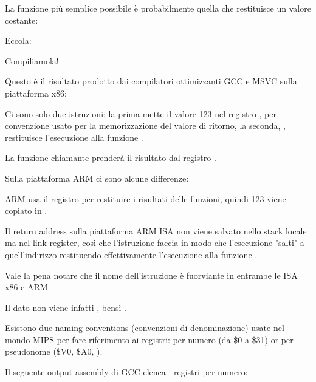 
La funzione più semplice possibile è probabilmente quella che restituisce un valore costante:

Eccola:



Compiliamola!


Questo è il risultato prodotto dai compilatori ottimizzanti GCC e MSVC sulla piattaforma x86:



Ci sono solo due istruzioni: la prima mette il valore 123 nel registro \EAX, per convenzione usato per la memorizzazione del valore di ritorno, la seconda, \RET, restituisce l'esecuzione alla funzione .

La funzione chiamante prenderà il risultato dal registro \EAX.


Sulla piattaforma ARM ci sono alcune differenze:



ARM usa il registro  per restituire i risultati delle funzioni, quindi 123 viene copiato in .

Il return address sulla piattaforma ARM \ac{ISA} non viene salvato nello stack locale ma nel link register, 
così che l'istruzione  faccia in modo che l'esecuzione "salti" a quell'indirizzo \EMDASH{} restituendo effettivamente l'esecuzione alla funzione .

Vale la pena notare che il nome dell'istruzione \MOV è fuorviante in entrambe le \ac{ISA} x86 e ARM. 

Il dato non viene infatti , bensì .


\label{MIPS_leaf_function_ex1}
Esistono due naming conventions (convenzioni di denominazione) usate nel mondo MIPS per fare riferimento ai registri: per numero (da \$0 a \$31) or per pseudonome (\$V0, \$A0, \etc{}).

Il seguente output assembly di GCC elenca i registri per numero:


